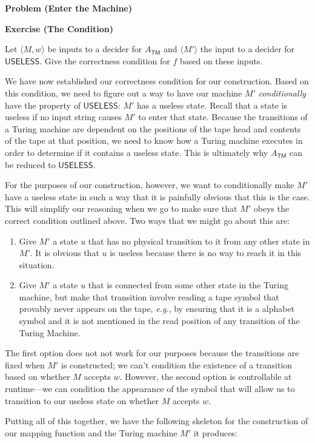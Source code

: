 \documentclass[12pt]{article}
\newcommand{\eg}{\emph{e.g.}\xspace}
\newenvironment{exercise}[1]{%
  \begin{shaded}
  \noindent\textbf{Exercise (#1)}\quad
}{\end{shaded}}
\newcounter{ProblemCounter}
\newenvironment{problem}[1][]
  {\refstepcounter{ProblemCounter}\noindent\textbf{Problem \theProblemCounter{} (#1)}\quad}
  {\newpage}
\newcommand{\prob}[1]{\ensuremath{\textsf{#1}}\xspace}
\newcommand{\desc}[1]{\ensuremath{\langle #1 \rangle}}
\newcommand{\Atm}{\ensuremath{A_\mathsf{TM}}\xspace}
\begin{document}
\begin{problem}[Enter the Machine]
\begin{exercise}{The Condition}
  Let \( \desc{M, w} \) be inputs to a decider for \Atm and \( \desc{M'} \) the
  input to a decider for \prob{USELESS}.  Give the correctness condition for \(
  f \) based on these inputs.
\end{exercise}

We have now established our correctness condition for our construction.  Based
on this condition, we need to figure out a way to have our machine \( M' \)
\emph{conditionally} have the property of \prob{USELESS}: \( M' \) has a useless
state.  Recall that a state is useless if no input string causes \( M '\) to
enter that state.  Because the transitions of a Turing machine are dependent on
the positions of the tape head and contents of the tape at that position, we
need to know how a Turing machine executes in order to determine if it contains
a useless state.  This is ultimately why \Atm can be reduced to \prob{USELESS}.

For the purposes of our construction, however, we want to conditionally make \(
M' \) have a useless state in such a way that it is painfully obvious that this
is the case.  This will simplify our reasoning when we go to make sure that \(
M' \) obeys the correct condition outlined above.  Two ways that we might go
about this are:
\begin{enumerate}
  \item Give \( M' \) a state \( u \) that has no physical transition to it from
    any other state in \( M' \).  It is obvious that \( u \) is useless because
    there is no way to reach it in this situation.
  \item Give \( M' \) a state \( u \) that is connected from some other state in
    the Turing machine, but make that transition involve reading a tape symbol
    that provably never appears on the tape, \eg, by ensuring that it is a
    alphabet symbol and it is not mentioned in the read position of any
    transition of the Turing Machine.
\end{enumerate}
The first option does not not work for our purposes because the transitions are
fixed when \( M' \) is constructed; we can't condition the existence of a
transition based on whether \( M \) accepts \( w \).  However, the second option
is controllable at runtime---we can condition the appearance of the symbol that
will allow us to transition to our useless state on whether \( M \) accepts \( w
\).

Putting all of this together, we have the following skeleton for the
construction of our mapping function and the Turing machine \( M' \) it
produces:


\end{problem}
\end{document}
